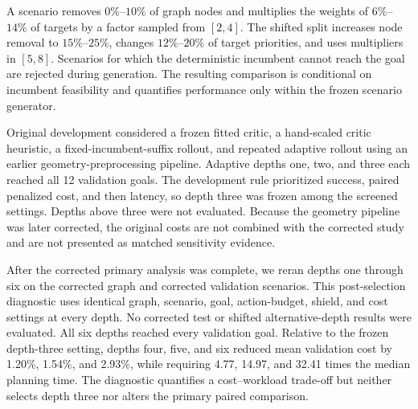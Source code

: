 \documentclass{IEEEtaes}
\theoremstyle{remark}
\theoremstyle{plain}
\begin{document}
A scenario removes $0\%$--$10\%$ of graph nodes and multiplies the weights of $6\%$--$14\%$ of targets by a factor sampled from $[2,4]$. The shifted split increases node removal to $15\%$--$25\%$, changes $12\%$--$20\%$ of target priorities, and uses multipliers in $[5,8]$. Scenarios for which the deterministic incumbent cannot reach the goal are rejected during generation. The resulting comparison is conditional on incumbent feasibility and quantifies performance only within the frozen scenario generator.

Original development considered a frozen fitted critic, a hand-scaled critic heuristic, a fixed-incumbent-suffix rollout, and repeated adaptive rollout using an earlier geometry-preprocessing pipeline. Adaptive depths one, two, and three each reached all 12 validation goals. The development rule prioritized success, paired penalized cost, and then latency, so depth three was frozen among the screened settings. Depths above three were not evaluated. Because the geometry pipeline was later corrected, the original costs are not combined with the corrected study and are not presented as matched sensitivity evidence.

After the corrected primary analysis was complete, we reran depths one through six on the corrected graph and corrected validation scenarios. This post-selection diagnostic uses identical graph, scenario, goal, action-budget, shield, and cost settings at every depth. No corrected test or shifted alternative-depth results were evaluated. All six depths reached every validation goal. Relative to the frozen depth-three setting, depths four, five, and six reduced mean validation cost by 1.20\%, 1.54\%, and 2.93\%, while requiring 4.77, 14.97, and 32.41 times the median planning time. The diagnostic quantifies a cost--workload trade-off but neither selects depth three nor alters the primary paired comparison.
\end{document}

